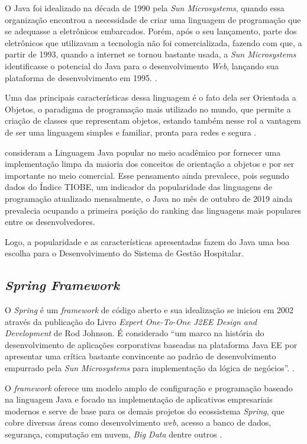 O Java foi idealizado na década de 1990 pela \textit{Sun Microsystems}, quando essa organização encontrou a necessidade de criar uma linguagem de programação que se adequasse a eletrônicos embarcados. Porém, após o seu lançamento, parte dos eletrônicos que utilizavam a tecnologia não foi comercializada, fazendo com que, a partir de 1993, quando a internet se tornou bastante usada, a \textit{Sun Microsystems} identificasse o potencial do Java para o desenvolvimento \textit{Web}, lançando sua plataforma de desenvolvimento em 1995. \cite{deitel}.

Uma das principais características dessa linguagem é o fato dela ser Orientada a Objetos, o paradigma de programação mais utilizado no mundo, que permite a criação de classes que representam objetos, estando também nesse rol a vantagem de ser uma linguagem simples e familiar, pronta para redes e segura \cite{claro}.

 consideram a Linguagem Java popular no meio acadêmico por fornecer uma implementação limpa da maioria dos conceitos de orientação a objetos e por ser importante no meio comercial. Esse pensamento ainda prevalece, pois segundo dados do Índice TIOBE, um indicador da popularidade das linguagens de programação atualizado mensalmente, o Java no mês de outubro de 2019 ainda prevalecia ocupando a primeira posição do ranking das linguagens mais populares entre os desenvolvedores.  

Logo, a popularidade e as características apresentadas fazem do Java uma boa escolha para o Desenvolvimento do Sistema de Gestão Hospitalar.

\subsection{\textbf{\textit{Spring Framework}}}

O \textit{Spring} é um \textit{framework} de código aberto e sua idealização se iniciou em 2002 através da publicação do Livro \textit{Expert One-To-One J2EE Design and Development} de Rod Johnson. É considerado ``um marco na história do desenvolvimento de aplicações corporativas baseadas na plataforma Java EE por apresentar uma crítica bastante convincente ao padrão de desenvolvimento empurrado pela \textit{Sun Microsystems} para implementação da lógica de negócios''. \cite[p. 16]{weissmann}.

O \textit{framework} oferece um modelo  amplo de configuração e programação baseado na linguagem Java e focado na implementação de aplicativos empresariais modernos e serve de base para os demais projetos do ecossistema \textit{Spring}, que cobre diversas áreas como desenvolvimento \textit{web}, acesso a banco de dados, segurança, computação em nuvem, \textit{Big Data} dentre outros \cite{afonso}.

